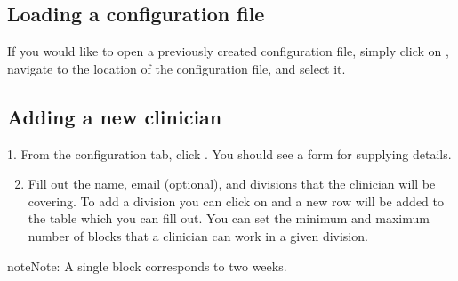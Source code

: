\documentclass[letterpaper,10pt,english]{sphinxmanual}
\begin{document}
\begin{figure}[h!]
\centering
{}\end{figure}


\subsection{Loading a configuration file}
\label{\detokenize{index:loading-a-configuration-file}}
If you would like to open a previously created configuration file, simply
click on , navigate to the location of the configuration file,
and select it.

\begin{figure}[h!]
\centering
{}\end{figure}


\subsection{Adding a new clinician}
\label{\detokenize{index:adding-a-new-clinician}}\label{\detokenize{index:id4}}
1. From the configuration tab, click . You should see a
form for supplying details.

\begin{figure}[h!]
\centering
{}\end{figure}

\begin{DUlineblock}{0em}
\item[] 
\end{DUlineblock}
\begin{enumerate}
\setcounter{enumi}{1}
\item {} 
Fill out the name, email (optional), and divisions that the clinician
will be covering. To add a division you can click on  and a new row
will be added to the table which you can fill out. You can set the minimum
and maximum number of blocks that a clinician can work in a given division.

\end{enumerate}

\begin{sphinxadmonition}{note}{Note:}
A single block corresponds to two weeks.
\end{sphinxadmonition}
\end{document}
